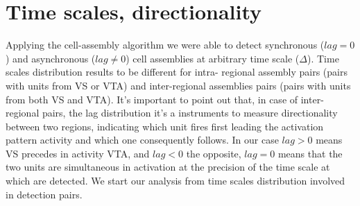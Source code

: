 \section{Time scales, directionality}
Applying the cell-assembly algorithm we were able to detect synchronous ($lag=0$) and asynchronous ($lag\neq 0$) cell assemblies at arbitrary time scale ($\Delta$). Time scales distribution results to be different for intra- regional assembly pairs (pairs with units from VS or VTA) and inter-regional assemblies pairs (pairs with units from both VS and VTA). It's important to point out that, in case of inter-regional pairs, the lag distribution it's a instruments to measure directionality between two regions, indicating which unit fires first leading the activation pattern activity and which one consequently follows. In our case $lag >0$ means VS precedes in activity VTA, and $lag <0$ the opposite, $lag=0$ means that the two units are  simultaneous in activation at the precision of the time scale at which are detected.
We start our analysis from time scales distribution involved in detection pairs.
